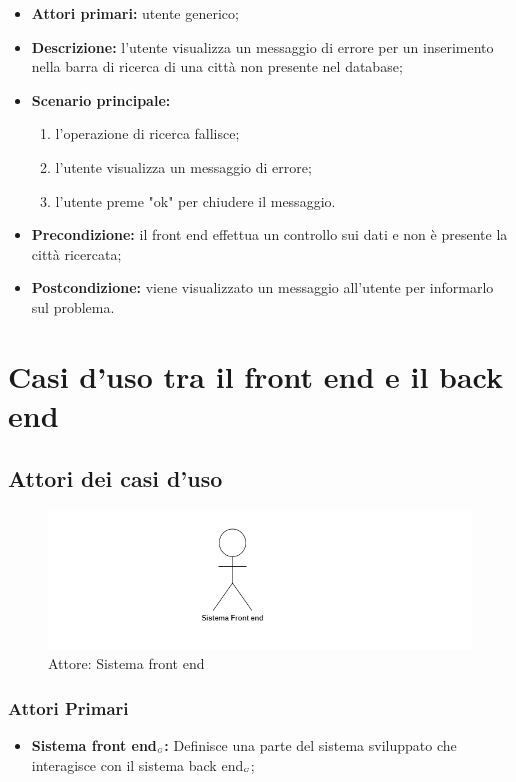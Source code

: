 \begin{itemize}
	\item \textbf{Attori primari:} utente generico;
	\item \textbf{Descrizione:} l’utente visualizza un messaggio di errore per un inserimento nella barra di ricerca di una città non presente nel database;
	\item \textbf{Scenario principale:} 
	\begin{enumerate}
		\item l’operazione di ricerca fallisce;
		\item l’utente visualizza un messaggio di errore;
		\item l’utente preme "ok" per chiudere il messaggio.
	\end{enumerate}
	\item \textbf{Precondizione:} il front end effettua un controllo sui dati e non è presente la città ricercata;
	\item \textbf{Postcondizione:} viene visualizzato  un messaggio all’utente per informarlo sul problema.
\end{itemize}

\section{Casi d'uso tra il front end e il back end}\label{CasiDUsoCasiDUsoTraIlFrontEndEIlBackEnd}

\subsection{Attori dei casi d'uso}\label{CasiDUsoCasiDUsoTraIlFrontEndEIlBackEndAttoriDeiCasiDUso}
\begin{center}
	\begin{figure}[H]
		\includegraphics{../immagini/attori_casi/sistema_front_end.png}
		\caption{Attore: Sistema front end}
	\end{figure}
\end{center}
\subsubsection{Attori Primari}\label{CasiDUsoCasiDUsoTraIlFrontEndEIlBackEndAttoriDeiCasiDUsoAttoriPrimari}
\begin{itemize}
	\item \textbf{Sistema front end$_{\scaleto{G}{3pt}}$:} Definisce una parte del sistema sviluppato che interagisce con il sistema back end$_{\scaleto{G}{3pt}}$;
\end{itemize}

